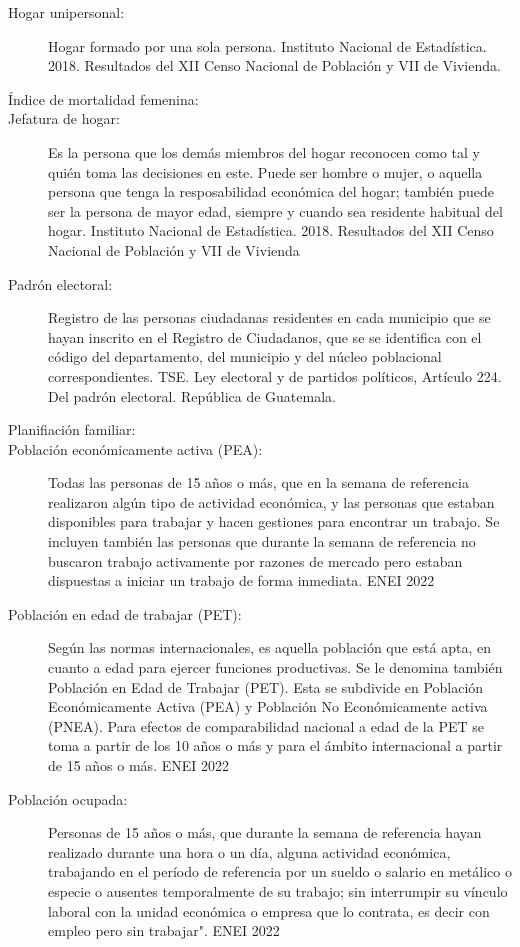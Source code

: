 \begin{description}
	\item[Hogar unipersonal:] Hogar formado por una sola persona. Instituto Nacional de Estadística. 2018. Resultados del XII Censo Nacional de Población y VII de Vivienda.
	\item[Índice de mortalidad femenina:] 
	\item[Jefatura de hogar:] Es la persona que los demás miembros del hogar reconocen como tal y quién toma las decisiones en este. Puede ser hombre o mujer, o aquella persona que tenga la resposabilidad económica del hogar; también puede ser la persona de mayor edad, siempre y cuando sea residente habitual del hogar. Instituto Nacional de Estadística. 2018. Resultados del XII Censo Nacional de Población y VII de Vivienda
	\item[Padrón electoral:] Registro de las personas ciudadanas residentes en cada municipio que se hayan inscrito en el Registro de Ciudadanos, que se se identifica con el código del departamento, del municipio y del núcleo poblacional correspondientes. TSE. Ley electoral y de partidos políticos, Artículo 224. Del padrón electoral. República de Guatemala.
	\item[Planifiación familiar:] 
	\item[Población económicamente activa (PEA):] Todas las personas de 15 años o más, que en la semana de referencia realizaron algún tipo de actividad económica, y las personas que estaban disponibles para trabajar y hacen gestiones para encontrar un trabajo. Se incluyen también las personas que durante la semana de referencia no buscaron trabajo activamente por razones de mercado pero estaban dispuestas a iniciar un trabajo de forma inmediata. ENEI 2022
	\item[Población en edad de trabajar (PET):] Según las normas internacionales, es aquella población que está apta, en cuanto a edad para ejercer funciones productivas. Se le denomina también Población en Edad de Trabajar (PET). Esta se subdivide en Población Económicamente Activa (PEA) y Población No Económicamente activa (PNEA). Para efectos de comparabilidad nacional a edad de la PET se toma a partir de los 10 años o más y para el ámbito internacional a partir de 15 años o más. ENEI 2022
	\item[Población ocupada:] Personas de 15 años o más, que durante la semana de referencia hayan realizado durante una hora o un día, alguna actividad económica, trabajando en el período de referencia por un sueldo o salario en metálico o especie o ausentes temporalmente de su trabajo; sin interrumpir su vínculo laboral con la unidad económica o empresa que lo contrata, es decir con empleo pero sin trabajar". ENEI 2022

\end{description}
